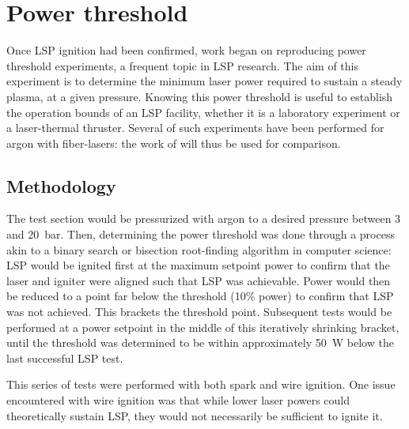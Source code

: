             

    \clearpage
    \section{Power threshold} \label{sec:results_powerthreshold}
        Once LSP ignition had been confirmed, work began on reproducing power threshold experiments, a frequent topic in LSP research. The aim of this experiment is to determine the minimum laser power required to sustain a steady plasma, at a given pressure. Knowing this power threshold is useful to establish the operation bounds of an LSP facility, whether it is a laboratory experiment or a laser-thermal thruster. Several of such experiments have been performed for argon with fiber-lasers: the work of \textcite{zimakovInteractionNearIRLaser2016, matsuiGeneratingConditionsArgon2019,luCharacteristicDiagnosticsLaserStabilized2022} will thus be used for comparison.
        
        \subsection{Methodology}
            The test section would be pressurized with argon to a desired pressure between 3 and 20~bar. Then, determining the power threshold was done through a process akin to a binary search or bisection root-finding algorithm in computer science: LSP would be ignited first at the maximum setpoint power to confirm that the laser and igniter were aligned such that LSP was achievable. Power would then be reduced to a point far below the threshold (10\% power) to confirm that LSP was not achieved. This brackets the threshold point. Subsequent tests would be performed at a power setpoint in the middle of this iteratively shrinking bracket, until the threshold was determined to be within approximately \qty{50}{W} below the last successful LSP test.

            This series of tests were performed with both spark and wire ignition. One issue encountered with wire ignition was that while lower laser powers could theoretically sustain LSP, they would not necessarily be sufficient to ignite it. 
            
